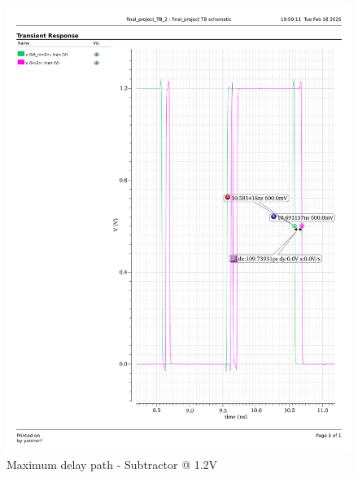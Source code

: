 \documentclass[a4paper,12pt]{article}
\begin{document}
\begin{figure}[H]
\begin{minipage}{0.49\textwidth}
        \includegraphics[width=\textwidth]{delay/CP_max_sub_1.2.pdf}
        \caption{Maximum delay path - Subtractor @ 1.2V}
    \end{minipage}
\end{figure}
\end{document}
